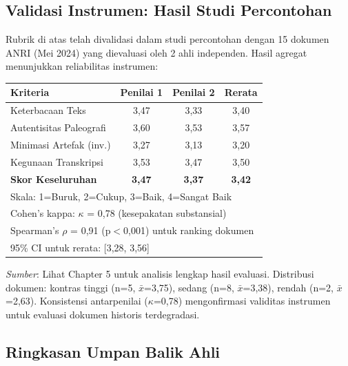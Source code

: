 \subsection*{Validasi Instrumen: Hasil Studi Percontohan}

Rubrik di atas telah divalidasi dalam studi percontohan dengan 15 dokumen ANRI (Mei 2024) yang dievaluasi oleh 2 ahli independen. Hasil agregat menunjukkan reliabilitas instrumen:

\begin{table}[h]
\centering
\small
\begin{tabular}{|l|c|c|c|}
\hline
\textbf{Kriteria} & \textbf{Penilai 1} & \textbf{Penilai 2} & \textbf{Rerata} \\
\hline
Keterbacaan Teks & 3,47 & 3,33 & 3,40 \\
Autentisitas Paleografi & 3,60 & 3,53 & 3,57 \\
Minimasi Artefak (inv.) & 3,27 & 3,13 & 3,20 \\
Kegunaan Transkripsi & 3,53 & 3,47 & 3,50 \\
\hline
\textbf{Skor Keseluruhan} & \textbf{3,47} & \textbf{3,37} & \textbf{3,42} \\
\hline
\multicolumn{4}{l}{\footnotesize Skala: 1=Buruk, 2=Cukup, 3=Baik, 4=Sangat Baik} \\
\multicolumn{4}{l}{\footnotesize Cohen's kappa: $\kappa$ = 0,78 (kesepakatan substansial)} \\
\multicolumn{4}{l}{\footnotesize Spearman's $\rho$ = 0,91 (p$<$0,001) untuk ranking dokumen} \\
\multicolumn{4}{l}{\footnotesize 95\% CI untuk rerata: [3,28, 3,56]} \\
\end{tabular}
\end{table}

\textit{Sumber}: Lihat Chapter 5 untuk analisis lengkap hasil evaluasi. Distribusi dokumen: kontras tinggi (n=5, $\bar{x}$=3,75), sedang (n=8, $\bar{x}$=3,38), rendah (n=2, $\bar{x}$=2,63). Konsistensi antarpenilai ($\kappa$=0,78) mengonfirmasi validitas instrumen untuk evaluasi dokumen historis terdegradasi.

\vspace{2em}


\subsection*{Ringkasan Umpan Balik Ahli}


